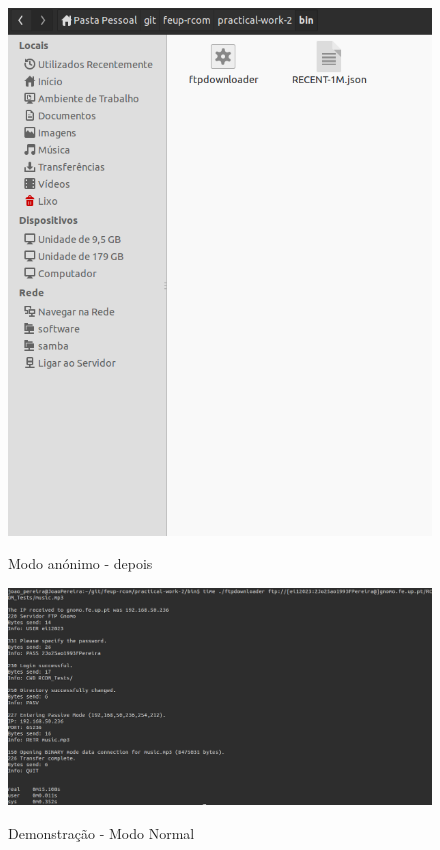 \documentclass[a4paper]{article}
\begin{document}
\begin{figure}[h!]
\centering
\caption{Modo anónimo - depois}
\includegraphics[scale=0.35]{res/depois-modoanonimo.png}
\label{fig:depoisanony}
\end{figure}

\pagebreak

\begin{figure}[h!]
\centering
\caption{Demonstração - Modo Normal}
\includegraphics[scale=0.3]{res/teste-normal.png}
\label{fig:normal}
\end{figure}
\end{document}
